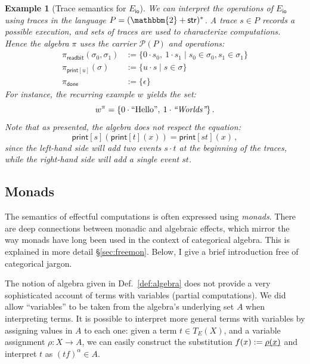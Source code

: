 \documentclass[11pt,oneside,draft]{book}
\newtheorem{example}[theorem]{Example}
\theoremstyle{definition}
\newcommand{\kw}[1]{\ensuremath{ \mathsf{#1} }}
\newcommand{\ul}[1]{%
  \underline{\smash{#1}}
}
\begin{document}
\begin{example}[Trace semantics for $E_\kw{io}$] %
We can interpret the operations of $E_\kw{io}$ using traces
in the language $P = (\mathbbm{2} + \kw{str})^*$.
A trace $s \in P$ records a possible execution,
and sets of traces are used to characterize computations.
Hence the algebra $\pi$ uses the carrier $\mathcal{P}(P)$
and operations:
\begin{align*}
  \pi_\kw{readbit}(\sigma_0, \sigma_1) &:=
    \{ 0 \cdot s_0, \: 1 \cdot s_1 \mid
       s_0 \in \sigma_0, s_1 \in \sigma_1 \}
  \\
  \pi_{\kw{print}[u]}(\sigma) &:=
    \{ u \cdot s \mid s \in \sigma \}
  \\
  \pi_{\kw{done}} &:=
    \{ \epsilon \}
\end{align*}
For instance, the recurring example $w$ yields the set:
\[
  w^\pi =
  \{ 0 \cdot \text{\rm ``Hello''}, \: 1 \cdot \text{\em ``Worlds''} \}
  \,.
\]
Note that as presented,
the algebra does not respect the equation:
\[
  \kw{print}[s](\kw{print}[t](x)) = \kw{print}[st](x)
  \,,
\]
since the left-hand side will add two events $s \cdot t$
at the beginning of the traces,
while the right-hand side will add a single event $st$.
\end{example}


\subsection{Monads} \label{sec:eff:mon} %

The semantics of effectful computations
is often expressed using \emph{monads}.
There are deep connections between
monadic and algebraic effects,
which mirror the way monads have long been used
in the context of categorical algebra.
This is explained in more detail \S\ref{sec:freemon}.
Below, I give a brief introduction
free of categorical jargon.

The notion of algebra
given in Def.~\ref{def:algebra}
does not provide a very sophisticated account
of terms with variables
(partial computations).
We did allow ``variables''
to be taken from the algebra's underlying set $A$
when interpreting terms.
It is possible to interpret
more general terms with variables
by assigning values in $A$ to each one:
given a term $t \in T_E(X)$, and
a variable assignment $\rho : X \rightarrow A$,
we can easily construct the substitution
$f(x) := \ul{\rho(x)}$
and interpret $t$ as $(tf)^\alpha \in A$.
\end{document}
